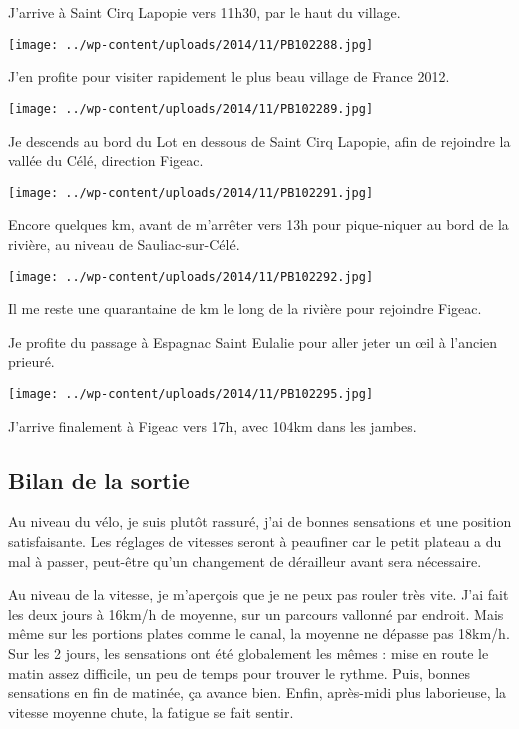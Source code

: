 J'arrive à Saint Cirq Lapopie vers 11h30, par le haut du village.

\begin{center} \texttt{[image: ../wp-content/uploads/2014/11/PB102288.jpg]} \end{center}

 J'en profite pour visiter rapidement le plus beau village de France 2012.
 
\begin{center} \texttt{[image: ../wp-content/uploads/2014/11/PB102289.jpg]} \end{center}

\pagebreak
 Je descends au bord du Lot en dessous de Saint Cirq Lapopie, afin de rejoindre la vallée du Célé, direction Figeac.
\begin{center} \texttt{[image: ../wp-content/uploads/2014/11/PB102291.jpg]} \end{center}

 Encore quelques km, avant de m'arrêter vers 13h pour pique-niquer au bord de la rivière, au niveau de Sauliac-sur-Célé.
\begin{center} \texttt{[image: ../wp-content/uploads/2014/11/PB102292.jpg]} \end{center}

 Il me reste une quarantaine de km le long de la rivière pour rejoindre Figeac.
 
 Je profite du passage à Espagnac Saint Eulalie pour aller jeter un œil à l'ancien prieuré.
\begin{center} \texttt{[image: ../wp-content/uploads/2014/11/PB102295.jpg]} \end{center}

 J'arrive finalement à Figeac vers 17h, avec 104km dans les jambes.
 
\subsection*{Bilan de la sortie}

 Au niveau du vélo, je suis plutôt rassuré, j'ai de bonnes sensations et une position satisfaisante. Les réglages de vitesses seront à peaufiner car le petit plateau a du mal à passer, peut-être qu'un changement de dérailleur avant sera nécessaire.

 Au niveau de la vitesse, je m'aperçois que je ne peux pas rouler très vite. J'ai fait les deux jours à 16km/h de moyenne, sur un parcours vallonné par endroit. Mais même sur les portions plates comme le canal, la moyenne ne dépasse pas 18km/h. Sur les 2 jours, les sensations ont été globalement les mêmes : mise en route le matin assez difficile, un peu de temps pour trouver le rythme. Puis, bonnes sensations en fin de matinée, ça avance bien. Enfin, après-midi plus laborieuse, la vitesse moyenne chute, la fatigue se fait sentir.

